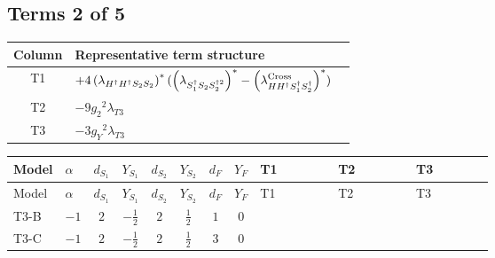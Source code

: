 \documentclass[8pt]{article}
\begin{document}
\begin{landscape}
\subsection*{Terms 2 of 5}
\begin{center}
\begin{tabular}{@{}c >{\raggedright\arraybackslash}p{0.82\linewidth}@{}}
\toprule
Column & Representative term structure \\
\midrule
T1 & \(\displaystyle +4 \left({\lambda_{H^\dagger H^\dagger S_2 S_2}}\right)^{*} (\left({\lambda_{S_1^\dagger S_2 S_2^{\dagger 2}}}\right)^{*}-\left({\lambda_{H H^\dagger S_1^\dagger S_2^\dagger}^{\rm Cross}}\right)^{*})\) \\
\midrule
T2 & \(\displaystyle -9 {g_2}^2 {\lambda_{T3}}\) \\
\midrule
T3 & \(\displaystyle -3 {g_Y}^2 {\lambda_{T3}}\) \\
\midrule
\bottomrule
\end{tabular}
\end{center}
\smallskip
\tiny
\begin{longtable}{@{}llcccccc >{\raggedright\arraybackslash}p{0.21\linewidth} >{\raggedright\arraybackslash}p{0.21\linewidth} >{\raggedright\arraybackslash}p{0.21\linewidth}@{}}
\toprule
Model & $\alpha$ & $d_{S_1}$ & $Y_{S_1}$ & $d_{S_2}$ & $Y_{S_2}$ & $d_F$ & $Y_F$ & T1 & T2 & T3 \\
\midrule
\endfirsthead
\toprule
Model & $\alpha$ & $d_{S_1}$ & $Y_{S_1}$ & $d_{S_2}$ & $Y_{S_2}$ & $d_F$ & $Y_F$ & T1 & T2 & T3 \\
\midrule
\endhead
T3-B & $-1$ & $2$ & $-\frac{1}{2}$ & $2$ & $\frac{1}{2}$ & $1$ & $0$ & \scriptsize\adjustbox{max width=\linewidth}{$\begin{gathered} +4 \left({\lambda_{H^\dagger H^\dagger S_2 S_2}}\right)^{*} (\left({\lambda_{S_1^\dagger S_2 S_2^{\dagger 2}}}\right)^{*}-\left({\lambda_{H H^\dagger S_1^\dagger S_2^\dagger}^{\rm Cross}}\right)^{*})\end{gathered}$} & \scriptsize\adjustbox{max width=\linewidth}{$\begin{gathered} -9 {g_2}^2 {\lambda_{T3}}\end{gathered}$} & \scriptsize\adjustbox{max width=\linewidth}{$\begin{gathered} -3 {g_Y}^2 {\lambda_{T3}}\end{gathered}$} \\
\midrule
T3-C & $-1$ & $2$ & $-\frac{1}{2}$ & $2$ & $\frac{1}{2}$ & $3$ & $0$ & \scriptsize\adjustbox{max width=\linewidth}{$\begin{gathered} +4 \left({\lambda_{H^\dagger H^\dagger S_2 S_2}}\right)^{*} (\left({\lambda_{S_1^\dagger S_2 S_2^{\dagger 2}}}\right)^{*}-\left({\lambda_{H H^\dagger S_1^\dagger S_2^\dagger}^{\rm Cross}}\right)^{*})\end{gathered}$} & \scriptsize\adjustbox{max width=\linewidth}{$\begin{gathered} -9 {g_2}^2 {\lambda_{T3}}\end{gathered}$} & \scriptsize\adjustbox{max width=\linewidth}{$\begin{gathered} -3 {g_Y}^2 {\lambda_{T3}}\end{gathered}$} \\

\end{longtable}
\end{landscape}
\end{document}
